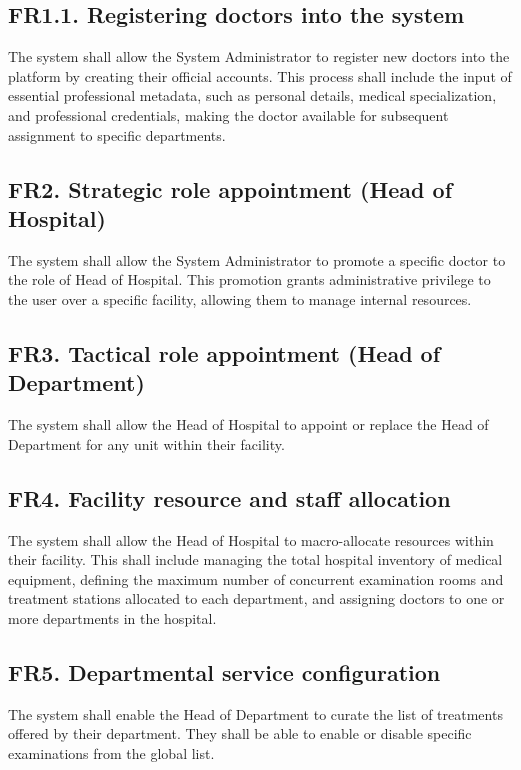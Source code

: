 \documentclass[12pt, a4paper]{article}
\begin{document}
\subsection{FR1.1. Registering doctors into the system} 
The system shall allow the System Administrator to register new doctors into the platform by creating their official accounts. This process shall include the input of essential professional metadata, such as personal details, medical specialization, and professional credentials, making the doctor available for subsequent assignment to specific departments.
\\ 

\subsection{FR2. Strategic role appointment (Head of Hospital)} \label{FR2}
The system shall allow the System Administrator to promote a specific doctor to the role of Head of Hospital. This promotion grants administrative privilege to the user over a specific facility, allowing them to manage internal resources.
\\ 


\subsection{FR3. Tactical role appointment (Head of Department)} \label{FR3}
The system shall allow the Head of Hospital to appoint or replace the Head of Department for any unit within their facility.
\\ 

\subsection{FR4. Facility resource and staff allocation} \label{FR4}
The system shall allow the Head of Hospital to macro-allocate resources within their facility. This shall include managing the total hospital inventory of medical equipment, defining the maximum number of concurrent examination rooms and treatment stations allocated to each department, and assigning doctors to one or more departments in the hospital.
\\ 

\subsection{FR5. Departmental service configuration} \label{FR5}
The system shall enable the Head of Department to curate the list of treatments offered by their department. They shall be able to enable or disable specific examinations from the global list.
\\ 
\end{document}
